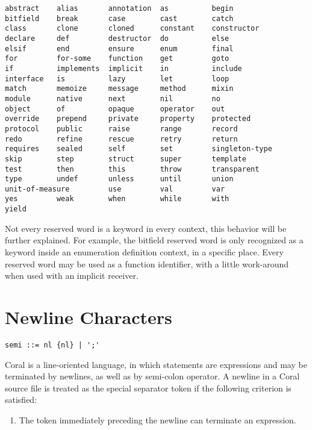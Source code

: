 \begin{lstlisting}
abstract    alias       annotation  as          begin
bitfield    break       case        cast        catch
class       clone       cloned      constant    constructor
declare     def         destructor  do          else
elsif       end         ensure      enum        final
for         for-some    function    get         goto
if          implements  implicit    in          include
interface   is          lazy        let         loop
match       memoize     message     method      mixin
module      native      next        nil         no
object      of          opaque      operator    out
override    prepend     private     property    protected
protocol    public      raise       range       record
redo        refine      rescue      retry       return
requires    sealed      self        set         singleton-type
skip        step        struct      super       template
test        then        this        throw       transparent
type        undef       unless      until       union
unit-of-measure         use         val         var
yes         weak        when        while       with
yield
\end{lstlisting}

Not every reserved word is a keyword in every context, this behavior will be further explained. For example, the bitfield reserved word is only recognized as a keyword inside an enumeration definition context, in a specific place. Every reserved word may be used as a function identifier, with a little work-around when used with an implicit receiver.

\section{Newline Characters}\label{sec:newlinecharacters}

\syntax\begin{lstlisting}
semi ::= nl {nl} | ';'
\end{lstlisting}

Coral is a line-oriented language, in which statements are expressions and may be terminated by newlines, as well as by semi-colon operator. A newline in a Coral source file is treated as the special separator token \lstinline@nl@ if the following criterion is satisfied:

\begin{enumerate}
\item The token immediately preceding the newline can terminate an expression.
\end{enumerate}

